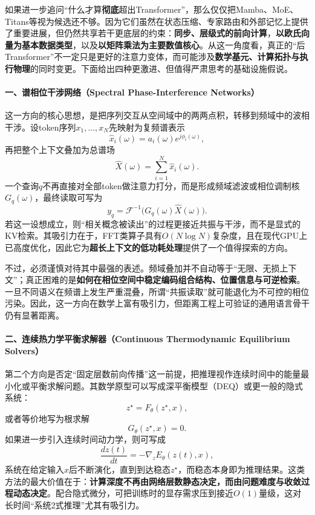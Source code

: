 \documentclass[12pt,a4paper]{article}
\begin{document}
如果进一步追问“什么才算\textbf{彻底}超出Transformer”，那么仅仅把Mamba、MoE、Titans等视为候选还不够。因为它们虽然在状态压缩、专家路由和外部记忆上提供了重要进展，但仍然共享若干更底层的约束：\textbf{同步、层级式的前向计算}，\textbf{以欧氏向量为基本数据类型}，以及\textbf{以矩阵乘法为主要数值核心}。从这一角度看，真正的“后Transformer”不一定只是更好的注意力变体，而可能涉及\textbf{数学基元、计算拓扑与执行物理}的同时变更。下面给出四种更激进、但值得严肃思考的基础设施假说。

\paragraph{一、谱相位干涉网络（Spectral Phase-Interference Networks）}

这一方向的核心思想，是把序列交互从空间域中的两两点积，转移到频域中的波相干涉。设token序列$x_1,\ldots,x_N$先映射为复频谱表示
\begin{equation}
\hat{x}_i(\omega) = a_i(\omega)e^{j\phi_i(\omega)},
\end{equation}
再把整个上下文叠加为总谱场
\begin{equation}
\hat{X}(\omega) = \sum_{i=1}^{N}\hat{x}_i(\omega).
\end{equation}
一个查询$q$不再直接对全部token做注意力打分，而是形成频域滤波或相位调制核$G_q(\omega)$，最终读取可写为
\begin{equation}
y_q = \mathcal{F}^{-1}\big(G_q(\omega)\hat{X}(\omega)\big).
\end{equation}
若这一设想成立，则“相关概念被读出”的过程更接近共振与干涉，而不是显式的KV检索。其吸引力在于，FFT类算子具有$O(N\log N)$复杂度，且在现代GPU上已高度优化，因此它为\textbf{超长上下文的低功耗处理}提供了一个值得探索的方向。

不过，必须谨慎对待其中最强的表述。频域叠加并不自动等于“无限、无损上下文”；真正困难的是\textbf{如何在相位空间中稳定编码组合结构、位置信息与可逆检索}。一旦不同语义在频谱上发生严重混叠，所谓“共振读取”就可能退化为不可控的相位污染。因此，这一方向在数学上富有吸引力，但距离工程上可验证的通用语言骨干仍有显著距离。

\paragraph{二、连续热力学平衡求解器（Continuous Thermodynamic Equilibrium Solvers）}

第二个方向是否定“固定层数前向传播”这一前提，把推理视作连续时间中的能量最小化或平衡求解问题。其数学原型可以写成深平衡模型（DEQ）或更一般的隐式系统：
\begin{equation}
z^\star = F_\theta(z^\star, x),
\end{equation}
或者等价地写为根求解
\begin{equation}
G_\theta(z^\star, x)=0.
\end{equation}
如果进一步引入连续时间动力学，则可写成
\begin{equation}
\frac{dz(t)}{dt} = - \nabla_z E_\theta(z(t), x),
\end{equation}
系统在给定输入$x$后不断演化，直到到达稳态$z^\star$，而稳态本身即为推理结果。这类方法的最大价值在于：\textbf{计算深度不再由网络层数静态决定，而由问题难度与收敛过程动态决定}。配合隐式微分，可把训练时的显存需求压到接近$O(1)$量级，这对长时间“系统2式推理”尤其有吸引力。
\end{document}
